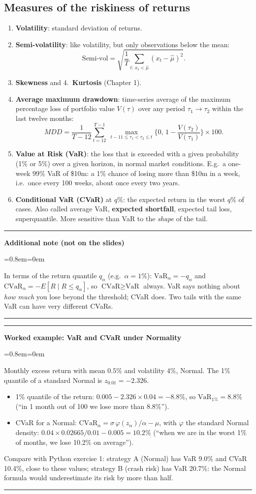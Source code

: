 \documentclass[11pt,a4paper]{report}
\newenvironment{notebox}[1]
  {\par\medskip\Needspace{6\baselineskip}\noindent\rule{\linewidth}{0.4pt}\par\nopagebreak
   \noindent\textbf{#1}\par\nopagebreak
   \begin{list}{}{\leftmargin=0.8em\rightmargin=0em\topsep=2pt}\item[]}
  {\end{list}\nopagebreak\noindent\rule{\linewidth}{0.4pt}\par\medskip}
\newenvironment{addnote}{\begin{notebox}{Additional note (not on the slides)}}{\end{notebox}}
\newenvironment{workedex}[1][]{\begin{notebox}{Worked example#1}}{\end{notebox}}
\begin{document}
\subsection{Measures of the riskiness of returns}
\begin{enumerate}
  \item \textbf{Volatility}: standard deviation of returns.
  \item \textbf{Semi-volatility}: like volatility, but only observations below the mean:
    \[ \text{Semi-vol}=\sqrt{\frac1T\sum_{t:\,x_t<\hat\mu}(x_t-\hat\mu)^2}. \]
  \item \textbf{Skewness} and 4.\ \textbf{Kurtosis} (Chapter 1).
  \setcounter{enumi}{4}
  \item \textbf{Average maximum drawdown}: time-series average of the maximum
    percentage loss of portfolio value $V(\tau)$ over any period
    $\tau_1\to\tau_2$ within the last twelve months:
    \[
    MDD=\frac{1}{T-12}\sum_{t=12}^{T-1}\ \max_{t-11\le\tau_1<\tau_2\le t}
    \Big\{0,\,1-\frac{V(\tau_2)}{V(\tau_1)}\Big\}\times100 .
    \]
  \item \textbf{Value at Risk (VaR)}: the loss that is exceeded with a given
    probability (1\% or 5\%) over a given horizon, in normal market conditions.
    E.g.\ a one-week 99\% VaR of \$10m: a 1\% chance of losing more than \$10m
    in a week, i.e.\ once every 100 weeks, about once every two years.
  \item \textbf{Conditional VaR (CVaR)} at $q\%$: the expected return in the worst
    $q\%$ of cases. Also called average VaR, \textbf{expected shortfall},
    expected tail loss, superquantile. More sensitive than VaR to the
    \emph{shape} of the tail.
\end{enumerate}

\begin{addnote}
In terms of the return quantile $q_\alpha$ (e.g.\ $\alpha=1\%$):
$\text{VaR}_\alpha=-q_\alpha$ and $\text{CVaR}_\alpha=-E[R\mid R\le q_\alpha]$,
so $\text{CVaR}\ge\text{VaR}$ always. VaR says nothing about \emph{how much} you
lose beyond the threshold; CVaR does. Two tails with the same VaR can have very
different CVaRs.
\end{addnote}


\begin{workedex}[: VaR and CVaR under Normality]
Monthly excess return with mean $0.5\%$ and volatility $4\%$, Normal. The 1\%
quantile of a standard Normal is $z_{0.01}=-2.326$.
\begin{itemize}
  \item 1\% quantile of the return: $0.005-2.326\times0.04=-8.8\%$, so
    $\text{VaR}_{1\%}=8.8\%$ (``in 1 month out of 100 we lose more than 8.8\%'').
  \item CVaR for a Normal: $\text{CVaR}_\alpha=\sigma\,\varphi(z_\alpha)/\alpha-\mu$,
    with $\varphi$ the standard Normal density: $0.04\times0.02665/0.01-0.005=10.2\%$
    (``when we are in the worst 1\% of months, we lose 10.2\% on average'').
\end{itemize}
Compare with Python exercise 1: strategy A (Normal) has VaR 9.0\% and CVaR 10.4\%,
close to these values; strategy B (crash risk) has VaR 20.7\%: the Normal
formula would underestimate its risk by more than half.
\end{workedex}
\end{document}
